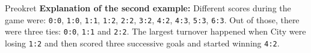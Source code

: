 \begin{statement}[
  problempoints=50,
  timelimit=1 second,
  memorylimit=512 MiB,
]{Preokret}
\textbf{Explanation of the second example:}
Different scores during the game were: \texttt{0:0}, \texttt{1:0},
\texttt{1:1}, \texttt{1:2}, \texttt{2:2}, \texttt{3:2}, \texttt{4:2},
\texttt{4:3}, \texttt{5:3}, \texttt{6:3}. Out of those, there were three
ties: \texttt{0:0}, \texttt{1:1} and \texttt{2:2}. The largest turnover happened
when City were losing \texttt{1:2} and then scored three successive goals and
started winning \texttt{4:2}.

\end{statement}

